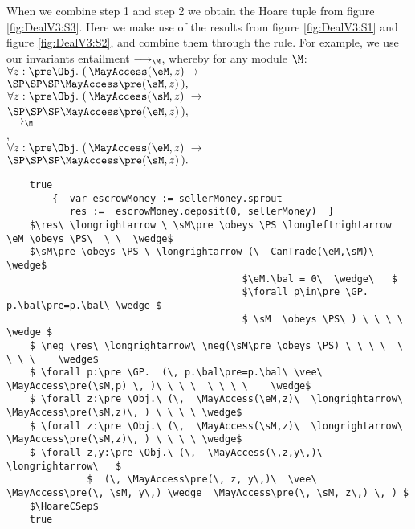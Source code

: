 When we combine step 1 and step 2 we obtain the Hoare tuple from figure \ref{fig:DealV3:S3}. Here we make use of the results from figure \ref{fig:DealV3:S1} and figure \ref{fig:DealV3:S2}, and combine them through the  rule. For example, we use our invariants entailment  $\longrightarrow_\M$, whereby for any module $\M$:\\
 $\forall z:\pre \Obj.\ (\,  \MayAccess(\eM,z)  \rightarrow$\\
 $\SP\SP\SP  \MayAccess\pre(\sM,z)\, ),\ $\\
$\forall z:\pre \Obj.\ (\,  \MayAccess(\sM,z)\  \rightarrow$ \\
$\SP\SP\SP   \MayAccess\pre(\eM,z)\, ), $\  \\
$\longrightarrow_\M$ \\
 {}, \\
 $\forall z:\pre \Obj.\ (\,  \MayAccess(\eM,z)\  \rightarrow$\\
 $\SP\SP\SP    \MayAccess\pre(\sM,z)\,).$

\begin{figure*}[htb]
\begin{lstlisting}
    true
        {  var escrowMoney := sellerMoney.sprout 
           res :=  escrowMoney.deposit(0, sellerMoney)  }
    $\res\ \longrightarrow \ \sM\pre \obeys \PS \longleftrightarrow  \eM \obeys \PS\  \ \  \wedge$  
    $\sM\pre \obeys \PS \ \longrightarrow (\  CanTrade(\eM,\sM)\  \wedge$
                                         $\eM.\bal = 0\  \wedge\   $
                                         $\forall p\in\pre \GP. p.\bal\pre=p.\bal\ \wedge $
                                         $ \sM  \obeys \PS\ ) \ \ \ \ \wedge $
    $ \neg \res\ \longrightarrow\ \neg(\sM\pre \obeys \PS) \ \ \ \  \ \ \ \    \wedge$                                  
    $ \forall p:\pre \GP.  (\, p.\bal\pre=p.\bal\ \vee\ \MayAccess\pre(\sM,p) \, )\ \ \ \  \ \ \ \    \wedge$
    $ \forall z:\pre \Obj.\ (\,  \MayAccess(\eM,z)\  \longrightarrow\   \MayAccess\pre(\sM,z)\, ) \ \ \ \ \wedge$
    $ \forall z:\pre \Obj.\ (\,  \MayAccess(\sM,z)\  \longrightarrow\   \MayAccess\pre(\sM,z)\, ) \ \ \ \ \wedge$
    $ \forall z,y:\pre \Obj.\ (\,  \MayAccess(\,z,y\,)\  \longrightarrow\   $
              $  (\, \MayAccess\pre(\, z, y\,)\  \vee\  \MayAccess\pre(\, \sM, y\,) \wedge  \MayAccess\pre(\, \sM, z\,) \, ) $
    $\HoareCSep$
    true
   \end{lstlisting}
\caption{Hoare tuple for first and second step in }
\label{fig:DealV3:S3}
\end{figure*}

